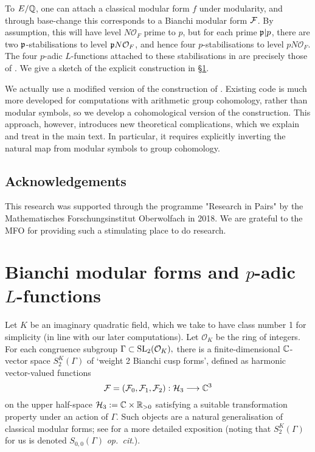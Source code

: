 \documentclass[a4paper,10pt]{article}
\newcommand{\cO}{\mathcal{O}}
\numberwithin{equation}{section}
\begin{document}
To $E/\mathbb{Q}$, one can attach a classical modular form $f$ under modularity, and through base-change this corresponds to a Bianchi modular form $\mathcal{F}$. By assumption, this will have level $N\cO_F$ prime to $p$, but for each prime $\mathfrak{p}|p$, there are two $\mathfrak{p}$-stabilisations to level $\pri N\cO_F$, and hence four $p$-stabilisations to level $pN\cO_F$. The four $p$-adic $L$-functions attached to these stabilisations in \cite{Wil17} are precisely those of \cite{Loe14}. We give a sketch of the explicit construction in \S\ref{sec:bianchi p-adic l-functions}.

We actually use a modified version of the construction of \cite{Wil17}. Existing code is much more developed for computations with arithmetic group cohomology, rather than modular symbols, so we develop a cohomological version of the construction. This approach, however, introduces new theoretical complications, which we explain and treat in the main text. In particular, it requires explicitly inverting the natural map from modular symbols to group cohomology.

\subsection*{Acknowledgements}
 This research was supported through the programme "Research in Pairs" by the Mathematisches Forschungsinstitut Oberwolfach in 2018. We are grateful to the MFO for providing such a stimulating place to do research. 


\section{Bianchi modular forms and \texorpdfstring{$p$}{p}-adic \texorpdfstring{$L$}{L}-functions}
\label{sec:bianchi p-adic l-functions}
Let $K$ be an imaginary quadratic field, which we take to have class number 1 for simplicity (in line with our later computations). Let $\mathcal{O}_K$ be the ring of integers. For each congruence subgroup $\Gamma \subset \mathrm{SL}_2(\mathcal{O}_K),$ there is a finite-dimensional $\mathbb{C}$-vector space $S_{2}^K(\Gamma)$ of `weight 2 Bianchi cusp forms', defined as harmonic vector-valued functions
\[
    \mathcal{F} = (\mathcal{F}_0,\mathcal{F}_1,\mathcal{F}_2) : \mathcal{H}_3 \longrightarrow \mathbb{C}^3
\]
 on the upper half-space $\mathcal{H}_3 := \mathbb{C}\times\mathbb{R}_{>0}$ satisfying a suitable transformation property under an action of $\Gamma.$ Such objects are a natural generalisation of classical modular forms; see \cite[\S1]{Wil17} for a more detailed exposition (noting that $S_2^K(\Gamma)$ for us is denoted $S_{0,0}(\Gamma)$ \emph{op.\ cit}.). 
 
\end{document}

